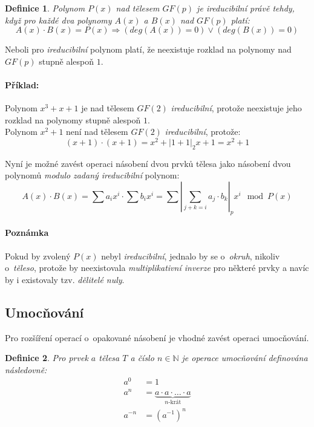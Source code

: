 \documentclass[thesis=M,czech,hidelinks]{FITthesis}[2012/06/26]
\newtheorem{definice}{Definice}
\begin{document}
\begin{definice}
    Polynom $P(x)$ nad tělesem $GF(p)$ je \emph{ireducibilní} právě tehdy, když
    pro každé dva polynomy $A(x)$ a $B(x)$ nad $GF(p)$ platí:
    $$ A(x) \cdot B(x) = P(x) \Rightarrow \left( deg(A(x)) = 0 \right) \lor
    \left( deg(B(x)) = 0 \right)$$
\end{definice}

Neboli pro \emph{ireducibilní} polynom platí, že neexistuje rozklad na polynomy
nad $GF(p)$ stupně alespoň $1$.

\paragraph{Příklad:} Polynom $x^3+x+1$ je nad tělesem $GF(2)$ \emph{ireducibilní},
protože neexistuje jeho rozklad na polynomy stupně alespoň $1$. \\
Polynom $x^2+1$ není nad tělesem $GF(2)$ \emph{ireducibilní}, protože:
$$(x+1)\cdot(x+1) = x^2 + \left|1+1\right|_2x + 1 = x^2+1 $$

Nyní je možné zavést operaci násobení dvou prvků tělesa jako násobení dvou
polynomů \emph{modulo} \emph{zadaný ireducibilní} polynom:
$$ A(x) \cdot B(x) = \sum a_i x^i \cdot \sum b_i x^i =
\sum \left|\sum_{j+k=i} a_j \cdot b_k\right|_p x^i \mod P(x) $$


\paragraph{Poznámka} Pokud by zvolený $P(x)$ nebyl \emph{ireducibilní}, jednalo
by se o~\emph{okruh}, nikoliv o~\emph{těleso}, protože by neexistovala
\emph{multiplikativní inverze} pro některé prvky a navíc by i existovaly
tzv. \emph{dělitelé nuly}.


\subsection{Umocňování}
Pro rozšíření operací o~opakované násobení je vhodné zavést operaci umocňování.

\begin{definice}
    Pro prvek $a$ tělesa $T$ a číslo $n\in\mathbb{N}$ je operace
    umocňování definována následovně:
    \begin{align*}
        a^0     &= 1 \\
        a^n     &= \underbrace{a \cdot a \cdot \ldots \cdot a}_{\text{$n$-krát}} \\
        a^{-n}  &= \left(a^{-1}\right)^n
    \end{align*}
\end{definice}
\end{document}
